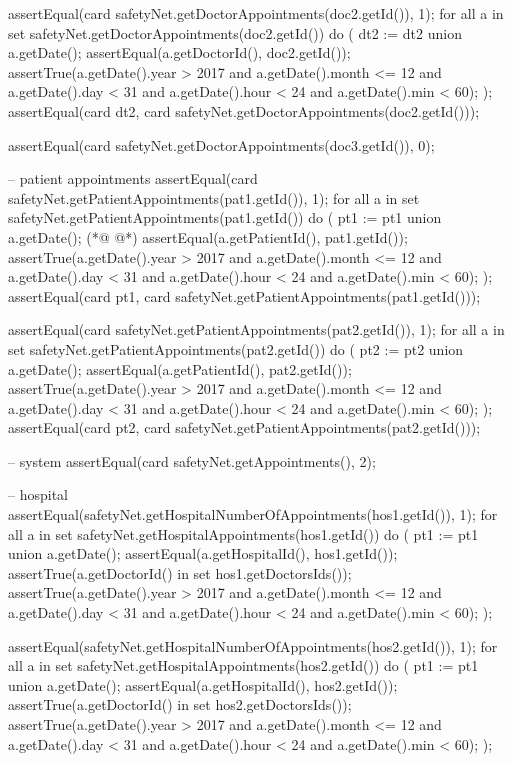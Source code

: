 \begin{vdmpp}[breaklines=true]
  assertEqual(card safetyNet.getDoctorAppointments(doc2.getId()), 1);
  for all a in set safetyNet.getDoctorAppointments(doc2.getId()) do (
   dt2 := dt2 union {a.getDate()};
   assertEqual(a.getDoctorId(), doc2.getId());
   assertTrue(a.getDate().year > 2017 and a.getDate().month <= 12 and a.getDate().day < 31 and a.getDate().hour < 24 and a.getDate().min < 60);
  );
  assertEqual(card dt2, card safetyNet.getDoctorAppointments(doc2.getId()));
  
  
  assertEqual(card safetyNet.getDoctorAppointments(doc3.getId()), 0);
  
  
  -- patient appointments
  assertEqual(card safetyNet.getPatientAppointments(pat1.getId()), 1);
  for all a in set safetyNet.getPatientAppointments(pat1.getId()) do (
   pt1 := pt1 union {a.getDate()};
(*@
\label{testRemoveAppointment:623}
@*)
   assertEqual(a.getPatientId(), pat1.getId());
   assertTrue(a.getDate().year > 2017 and a.getDate().month <= 12 and a.getDate().day < 31 and a.getDate().hour < 24 and a.getDate().min < 60);
  );
  assertEqual(card pt1, card safetyNet.getPatientAppointments(pat1.getId()));
  
  
  assertEqual(card safetyNet.getPatientAppointments(pat2.getId()), 1);
  for all a in set safetyNet.getPatientAppointments(pat2.getId()) do (
   pt2 := pt2 union {a.getDate()};
   assertEqual(a.getPatientId(), pat2.getId());
   assertTrue(a.getDate().year > 2017 and a.getDate().month <= 12 and a.getDate().day < 31 and a.getDate().hour < 24 and a.getDate().min < 60);
  );
  assertEqual(card pt2, card safetyNet.getPatientAppointments(pat2.getId()));
  
  -- system
  assertEqual(card safetyNet.getAppointments(), 2);
  
  -- hospital
  assertEqual(safetyNet.getHospitalNumberOfAppointments(hos1.getId()), 1);
  for all a in set safetyNet.getHospitalAppointments(hos1.getId()) do (
   pt1 := pt1 union {a.getDate()};
   assertEqual(a.getHospitalId(), hos1.getId());
   assertTrue(a.getDoctorId() in set hos1.getDoctorsIds());
   assertTrue(a.getDate().year > 2017 and a.getDate().month <= 12 and a.getDate().day < 31 and a.getDate().hour < 24 and a.getDate().min < 60);
  );
   
  assertEqual(safetyNet.getHospitalNumberOfAppointments(hos2.getId()), 1);  
  for all a in set safetyNet.getHospitalAppointments(hos2.getId()) do (
   pt1 := pt1 union {a.getDate()};
   assertEqual(a.getHospitalId(), hos2.getId());
   assertTrue(a.getDoctorId() in set hos2.getDoctorsIds());
   assertTrue(a.getDate().year > 2017 and a.getDate().month <= 12 and a.getDate().day < 31 and a.getDate().hour < 24 and a.getDate().min < 60);
  );
  

\end{vdmpp}
